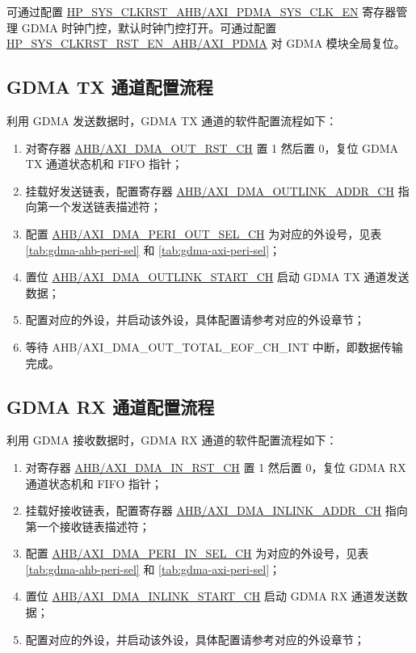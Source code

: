 \documentclass[main\_\_CN.tex]{subfiles}
\begin{document}
可通过配置 \hyperref[fielddesc:HPSYSCLKRSTAHBPDMASYSCLKEN]{HP\_SYS\_CLKRST\_AHB/AXI\_PDMA\_SYS\_CLK\_EN} 寄存器管理 GDMA 时钟门控，默认时钟门控打开。可通过配置 \hyperref[fielddesc:HPSYSCLKRSTRSTENAHBPDMA]{HP\_SYS\_CLKRST\_RST\_EN\_AHB/AXI\_PDMA} 对 GDMA 模块全局复位。

\subsection{GDMA TX 通道配置流程}
利用 GDMA 发送数据时，GDMA TX 通道的软件配置流程如下：
\begin{enumerate}
    \item 对寄存器 \hyperref[fielddesc:AHBDMAOUTRSTCHN]{AHB/AXI\_DMA\_OUT\_RST\_CH} 置 1 然后置 0，复位 GDMA TX 通道状态机和 FIFO 指针；
    \item 挂载好发送链表，配置寄存器 \hyperref[fielddesc:AHBDMAOUTLINKADDRCHN]{AHB/AXI\_DMA\_OUTLINK\_ADDR\_CH} 指向第一个发送链表描述符；
    \item 配置 \hyperref[fielddesc:AHBDMAPERIOUTSELCHN]{AHB/AXI\_DMA\_PERI\_OUT\_SEL\_CH} 为对应的外设号，见表 \ref{tab:gdma-ahb-peri-sel} 和 \ref{tab:gdma-axi-peri-sel}；
    \item 置位 \hyperref[fielddesc:AHBDMAOUTLINKSTARTCHN]{AHB/AXI\_DMA\_OUTLINK\_START\_CH} 启动 GDMA TX 通道发送数据；
    \item 配置对应的外设，并启动该外设，具体配置请参考对应的外设章节；
    \item 等待 AHB/AXI\_DMA\_OUT\_TOTAL\_EOF\_CH\_INT 中断，即数据传输完成。
\end{enumerate}

\subsection{GDMA RX 通道配置流程}
利用 GDMA 接收数据时，GDMA RX 通道的软件配置流程如下：
\begin{enumerate}
    \item 对寄存器 \hyperref[fielddesc:AHBDMAINRSTCHN]{AHB/AXI\_DMA\_IN\_RST\_CH} 置 1 然后置 0，复位 GDMA RX 通道状态机和 FIFO 指针；
    \item 挂载好接收链表，配置寄存器 \hyperref[fielddesc:AHBDMAINLINKADDRCHN]{AHB/AXI\_DMA\_INLINK\_ADDR\_CH} 指向第一个接收链表描述符；
    \item 配置 \hyperref[fielddesc:AHBDMAPERIINSELCHN]{AHB/AXI\_DMA\_PERI\_IN\_SEL\_CH} 为对应的外设号，见表 \ref{tab:gdma-ahb-peri-sel} 和 \ref{tab:gdma-axi-peri-sel}；
    \item 置位 \hyperref[fielddesc:AHBDMAINLINKSTARTCHN]{AHB/AXI\_DMA\_INLINK\_START\_CH} 启动 GDMA RX 通道发送数据；
    \item 配置对应的外设，并启动该外设，具体配置请参考对应的外设章节；
\end{enumerate}
\end{document}
